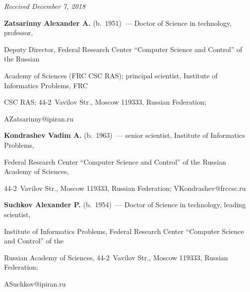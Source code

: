 \vspace*{-6pt}



\hfill{\small\textit{Received December 7, 2018}}



\vspace*{-6pt}





\Contr



\vspace*{-3pt}



\noindent

\textbf{Zatsarinny Alexander A.} (b.\ 1951)~--- Doctor of Science in technology, professor, 

Deputy Director, Federal Research Center ``Computer Science and Control'' of the Russian 

Academy of Sciences (FRC CSC RAS); principal scientist, Institute of Informatics Problems, FRC 

CSC RAS; 44-2~Vavilov Str., Moscow 119333, Russian Federation; 

\mbox{AZatsarinny@ipiran.ru}



\vspace*{3pt}



\noindent

\textbf{Kondrashev Vadim A.} (b.\ 1963)~--- senior scientist, Institute of Informatics Problems, 

Federal Research Center ``Computer Science and Control'' of the Russian Academy of Sciences, 

44-2~Vavilov Str., Moscow 119333, Russian Federation; \mbox{VKondrashev@frccsc.ru}



\vspace*{3pt}



\noindent

\textbf{Suchkov Alexander P.} (b.\ 1954)~--- Doctor of Science in technology, leading scientist, 

Institute of Informatics Problems, Federal Research Center ``Computer Science and Control'' of the 

Russian Academy of Sciences, 44-2~Vavilov Str., Moscow 119333, Russian Federation; 

\mbox{ASuchkov@ipiran.ru} 



\label{end\stat}





\renewcommand{\bibname}{\protect\rm Литература}

